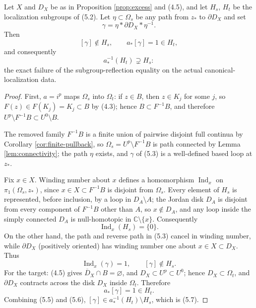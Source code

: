 \begin{theorem}\label{thm:subgroup-defect}
Let \(X\) and \(D_X\) be as in Proposition \ref{prop:excess} and (4.5), and let \(H_s\), \(H_t\) be the localization subgroups of (5.2).  Let \(\eta\subset\Omega_s\) be any path from \(z_*\) to \(\partial D_X\) and set
\[
 \gamma=\eta*\partial D_X*\eta^{-1}.       \tag{5.3}
\]
Then
\[
 [\gamma]\notin H_s,\qquad a_*[\gamma]=1\in H_t,
\]
and consequently
\[
 a_*^{-1}(H_t)\supsetneq H_s:                          \tag{5.7}
\]
the exact failure of the subgroup-reflection equality on the actual canonical-localization data.
\end{theorem}

\begin{proof}
First, \(a=i^p\) maps \(\Omega_s\) into \(\Omega_t\): if \(z\in B\), then \(z\in K_j\) for some \(j\), so \(F(z)\in F(K_j)=K_j\subset B\) by (4.3); hence \(B\subset F^{-1}B\), and therefore \(U^p\setminus F^{-1}B\subset U^0\setminus B\).

The removed family \(F^{-1}B\) is a finite union of pairwise disjoint full continua by Corollary \ref{cor:finite-pullback}, so \(\Omega_s=U^p\setminus F^{-1}B\) is path connected by Lemma \ref{lem:connectivity}; the path \(\eta\) exists, and \(\gamma\) of (5.3) is a well-defined based loop at \(z_*\).

Fix \(x\in X\).  Winding number about \(x\) defines a homomorphism \(\operatorname{Ind}_x\) on \(\pi_1(\Omega_s,z_*)\), since \(x\in X\subset F^{-1}B\) is disjoint from \(\Omega_s\).  Every element of \(H_s\) is represented, before inclusion, by a loop in \(D_A\setminus A\); the Jordan disk \(D_A\) is disjoint from every component of \(F^{-1}B\) other than \(A\), so \(x\notin D_A\), and any loop inside the simply connected \(D_A\) is null-homotopic in \(\mathbb C\setminus\{x\}\).  Consequently
\[
 \operatorname{Ind}_x(H_s)=\{0\}.                     \tag{5.4}
\]
On the other hand, the path and reverse path in (5.3) cancel in winding number, while \(\partial D_X\) (positively oriented) has winding number one about \(x\in X\subset D_X\).  Thus
\[
 \operatorname{Ind}_x(\gamma)=1,\qquad [\gamma]\notin H_s.  \tag{5.5}
\]
For the target: (4.5) gives \(\overline D_X\cap B=\varnothing\), and \(D_X\subset U^p\subset U^0\); hence \(D_X\subset\Omega_t\), and \(\partial D_X\) contracts across the disk \(D_X\) inside \(\Omega_t\).  Therefore
\[
 a_*[\gamma]=1\in H_t.                                \tag{5.6}
\]
Combining (5.5) and (5.6), \([\gamma]\in a_*^{-1}(H_t)\setminus H_s\), which is (5.7).
\end{proof}
